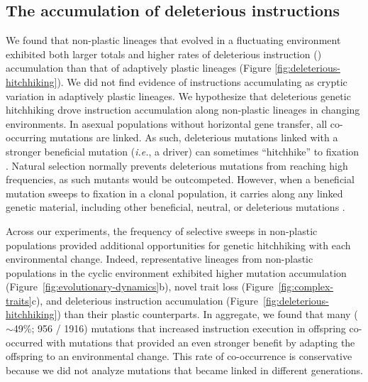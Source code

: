 \subsection{The accumulation of deleterious instructions}

We found that non-plastic lineages that evolved in a fluctuating environment exhibited both larger totals and higher rates of deleterious instruction () accumulation than that of adaptively plastic lineages (Figure \ref{fig:deleterious-hitchhiking}).
We did not find evidence of  instructions accumulating as cryptic variation in adaptively plastic lineages.
We hypothesize that deleterious genetic hitchhiking drove  instruction accumulation along non-plastic lineages in changing environments.
In asexual populations without horizontal gene transfer, all co-occurring mutations are linked.
As such, deleterious mutations linked with a stronger beneficial mutation (\textit{i.e.}, a driver) can sometimes ``hitchhike'' to fixation \citep{smith_hitch-hiking_1974,van_den_bergh_experimental_2018,buskirk_hitchhiking_2017}.
Natural selection normally prevents deleterious mutations from reaching high frequencies, as such mutants would be outcompeted.
However, when a beneficial mutation sweeps to fixation in a clonal population, it carries along any linked genetic material, including other beneficial, neutral, or deleterious mutations  \cite{barton_genetic_2000, smith_hitch-hiking_1974}.

Across our experiments, the frequency of selective sweeps in non-plastic populations provided additional opportunities for genetic hitchhiking with each environmental change. 
Indeed, representative lineages from non-plastic populations in the cyclic environment exhibited higher mutation accumulation (Figure~\ref{fig:evolutionary-dynamics}b), novel trait loss (Figure~\ref{fig:complex-traits}c), and deleterious instruction accumulation (Figure~\ref{fig:deleterious-hitchhiking}) than their plastic counterparts.
In aggregate, we found that many ($\sim$49\%; 956 / 1916) mutations that increased  instruction execution in offspring co-occurred with mutations that provided an even stronger benefit by adapting the offspring to an environmental change.
This rate of co-occurrence is conservative because we did not analyze mutations that became linked in different generations.

